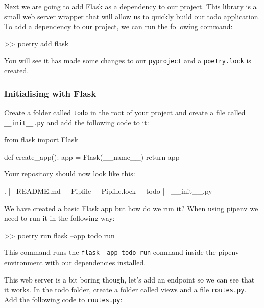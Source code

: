 \documentclass{csse4400}
\begin{document}

Next we are going to add Flask as a dependency to our project. This library is a small web server wrapper that will allow us to quickly build our todo application. To add a dependency to our project, we can run the following command:

\begin{code}[language=bash,numbers=none]{}
  >> poetry add flask
\end{code}

You will see it has made some changes to our \texttt{pyproject} and a \texttt{poetry.lock} is created.

\subsubsection{Initialising with Flask}

Create a folder called  \texttt{todo} in the root of your project and create a file called \texttt{\_\_init\_\_.py} and add the following code to it:

\begin{code}[language=python]{}
  from flask import Flask

  def create_app():
      app = Flask(__name__)
      return app
\end{code}

Your repository should now look like this:

\begin{code}[language=bash,numbers=none]{}
  .
  |-- README.md
  |-- Pipfile
  |-- Pipfile.lock
  |-- todo
      |-- __init__.py
\end{code}

We have created a basic Flask app but how do we run it?
When using pipenv we need to run it in the following way:

\begin{code}[language=bash,numbers=none]{}
  >> poetry run flask --app todo run
\end{code}

This command runs the \texttt{flask --app todo run} command inside the pipenv environment with our dependencies installed.

This web server is a bit boring though, let's add an endpoint so we can see that it works. In the todo folder, create a folder called views and a file \texttt{routes.py}. Add the following code to  \texttt{routes.py}:
\end{document}
